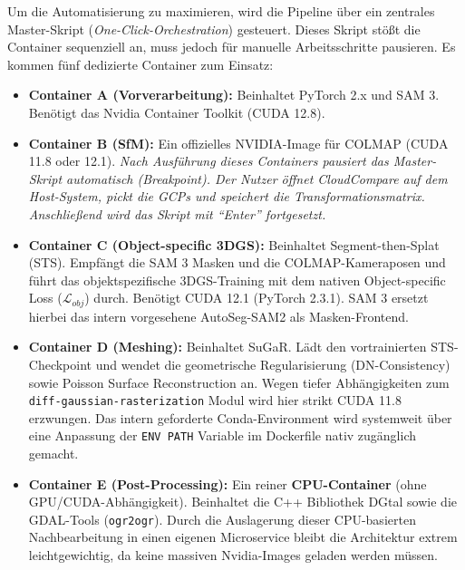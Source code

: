 \documentclass[12pt,a4paper]{article}
\begin{document}
Um die Automatisierung zu maximieren, wird die Pipeline über ein zentrales Master-Skript (\textit{One-Click-Orchestration}) gesteuert. Dieses Skript stößt die Container sequenziell an, muss jedoch für manuelle Arbeitsschritte pausieren. Es kommen fünf dedizierte Container zum Einsatz:
\begin{itemize}
    \item \textbf{Container A (Vorverarbeitung):} Beinhaltet PyTorch 2.x und SAM 3. Benötigt das Nvidia Container Toolkit (CUDA 12.8).
    \item \textbf{Container B (SfM):} Ein offizielles NVIDIA-Image für COLMAP (CUDA 11.8 oder 12.1). \textit{Nach Ausführung dieses Containers pausiert das Master-Skript automatisch (Breakpoint). Der Nutzer öffnet CloudCompare auf dem Host-System, pickt die GCPs und speichert die Transformationsmatrix. Anschließend wird das Skript mit ``Enter'' fortgesetzt.}
    \item \textbf{Container C (Object-specific 3DGS):} Beinhaltet Segment-then-Splat (STS). Empfängt die SAM 3 Masken und die COLMAP-Kameraposen und führt das objektspezifische 3DGS-Training mit dem nativen Object-specific Loss ($\mathcal{L}_{obj}$) durch. Benötigt CUDA 12.1 (PyTorch 2.3.1). SAM 3 ersetzt hierbei das intern vorgesehene AutoSeg-SAM2 als Masken-Frontend.
    \item \textbf{Container D (Meshing):} Beinhaltet SuGaR. Lädt den vortrainierten STS-Checkpoint und wendet die geometrische Regularisierung (DN-Consistency) sowie Poisson Surface Reconstruction an. Wegen tiefer Abhängigkeiten zum \texttt{diff-gaussian-rasterization} Modul wird hier strikt CUDA 11.8 erzwungen. Das intern geforderte Conda-Environment wird systemweit über eine Anpassung der \texttt{ENV PATH} Variable im Dockerfile nativ zugänglich gemacht.
    \item \textbf{Container E (Post-Processing):} Ein reiner \textbf{CPU-Container} (ohne GPU/CUDA-Abhängigkeit). Beinhaltet die C++ Bibliothek DGtal sowie die GDAL-Tools (\texttt{ogr2ogr}). Durch die Auslagerung dieser CPU-basierten Nachbearbeitung in einen eigenen Microservice bleibt die Architektur extrem leichtgewichtig, da keine massiven Nvidia-Images geladen werden müssen.
\end{itemize}
\end{document}

